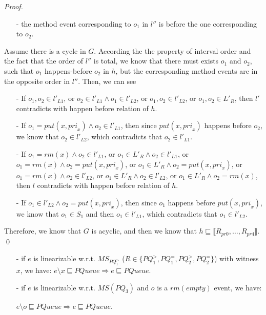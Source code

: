 \begin {proof}
\begin{itemize}
\item[-] the method event corresponding to $o_1$ in $l''$ is before the one corresponding to $o_2$.
\end{itemize}

Assume there is a cycle in $G$. According the the property of interval order and the fact that the order of $l''$ is total, we know that there must exists $o_1$ and $o_2$, such that $o_1$ happens-before $o_2$ in $h$, but the corresponding method events are in the opposite order in $l''$. Then, we can see

\begin{itemize}
\setlength{\itemsep}{0.5pt}
\item[-] If $o_1,o_2 \in l'_{L1}$, or $o_2 \in l'_{L1} \wedge o_1 \in l'_{L2}$, or $o_1,o_2 \in l'_{L2}$, or $o_1,o_2 \in L'_R$, then $l'$ contradicts with happen before relation of $h$.

\item[-] If $o_1 = \textit{put}(x,\textit{pri}_x) \wedge o_2 \in l'_{L1}$, then since $\textit{put}(x,\textit{pri}_x)$ happens before $o_2$, we know that $o_2 \in l'_{L2}$, which contradicts that $o_2 \in l'_{L1}$.

\item[-] If $o_1 = \textit{rm}(x) \wedge o_2 \in l'_{L1}$, or $o_1 \in L'_R \wedge o_2 \in l'_{L1}$, or $o_1 = \textit{rm}(x) \wedge o_2 = \textit{put}(x,\textit{pri}_x)$, or $o_1 \in L'_R \wedge o_2 = \textit{put}(x,\textit{pri}_x)$, or $o_1 = \textit{rm}(x) \wedge o_2 \in l'_{L2}$, or $o_1 \in L'_R \wedge o_2 \in l'_{L2}$, or $o_1 \in L'_R \wedge o_2 = \textit{rm}(x)$, then $l$ contradicts with happen before relation of $h$.

\item[-] If $o_1 \in l'_{L2} \wedge o_2 = \textit{put}(x,\textit{pri}_x)$, then since $o_1$ happens before $\textit{put}(x,\textit{pri}_x)$, we know that $o_1 \in S_1$ and then $o_1 \in l'_{L1}$, which contradicts that $o_1 \in l'_{L2}$.
\end{itemize}

Therefore, we know that $G$ is acyclic, and then we know that $h \sqsubseteq \llbracket R_{\textit{pr0}},\ldots,R_{\textit{pr4}} \rrbracket$. \qed

\end {proof}

\begin{itemize}
\setlength{\itemsep}{0.5pt}
\item[-] if $e$ is linearizable w.r.t. $\textit{MS}_{\textit{PQ}_1^{>}}$ ($R \in \{ \textit{PQ}_1^{>}, \textit{PQ}_1^{=}, \textit{PQ}_2^{>},\textit{PQ}_2^{=} \}$) with witness $x$, we have: $e \setminus x \sqsubseteq \textit{PQueue} \Rightarrow e \sqsubseteq \textit{PQueue}$.

\item[-] if $e$ is linearizable w.r.t. $\textit{MS}(\textit{PQ}_3)$ and $o$ is a $\textit{rm}(\textit{empty})$ event, we have:

$e \setminus o \sqsubseteq \textit{PQueue} \Rightarrow e \sqsubseteq \textit{PQueue}$.
\end{itemize}


